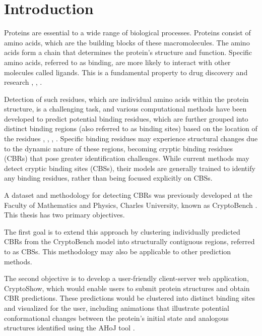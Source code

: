\chapter*{Introduction}

Proteins are essential to a wide range of biological processes. Proteins consist of amino acids, which are the building blocks of these macromolecules. The amino acids form a chain that determines the protein's structure and function. Specific amino acids, referred to as binding, are more likely to interact with other molecules called ligands. This is a fundamental property to drug discovery and research \cite{trainor2007importance}, \cite{ballante2021protein}, \cite{mannhold2006protein}.

Detection of such residues, which are individual amino acids within the protein structure, is a challenging task, and various computational methods have been developed to predict potential binding residues, which are further grouped into distinct binding regions (also referred to as binding sites) based on the location of the residues \cite{krivak2018p2rank}, \cite{le2009fpocket}, \cite{aggarwal2021deeppocket}, \cite{smith2024graph}. Specific binding residues may experience structural changes due to the dynamic nature of these regions, becoming cryptic binding residues (CBRs) that pose greater identification challenges. While current methods may detect cryptic binding sites (CBSs), their models are generally trained to identify any binding residues, rather than being focused explicitly on CBSs.

A dataset and methodology for detecting CBRs was previously developed at the Faculty of Mathematics and Physics, Charles University, known as CryptoBench \cite{vskrhak2025cryptobench}. This thesis has two primary objectives. 

The first goal is to extend this approach by clustering individually predicted CBRs from the CryptoBench model into structurally contiguous regions, referred to as CBSs. This methodology may also be applicable to other prediction methods.

The second objective is to develop a user-friendly client-server web application, CryptoShow, which would enable users to submit protein structures and obtain CBR predictions. These predictions would be clustered into distinct binding sites and visualized for the user, including animations that illustrate potential conformational changes between the protein's initial state and analogous structures identified using the AHoJ tool \cite{feidakis2022ahoj}.

